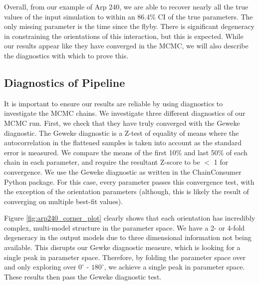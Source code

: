 Overall, from our example of Arp 240, we are able to recover nearly all the true values of the input simulation to within an 86.4\% CI of the true parameters. The only missing parameter is the time since the flyby. There is significant degeneracy in constraining the orientations of this interaction, but this is expected. While our results appear like they have converged in the MCMC, we will also describe the diagnostics with which to prove this. 

\subsection{Diagnostics of Pipeline}
\noindent It is important to ensure our results are reliable by using diagnostics to investigate the MCMC chains. We investigate three different diagnostics of our MCMC run. First, we check that they have truly converged with the Geweke diagnostic. The Geweke diagnostic is a Z-test of equality of means where the autocorrelation in the flattened samples is taken into account as the standard error is measured. We compare the means of the first 10\% and last 50\% of each chain in each parameter, and require the resultant Z-score to be $<$ 1 for convergence. We use the Geweke diagnostic as written in the ChainConsumer \citep{2016JOSS....1...45H} Python package. For this case, every parameter passes this convergence test, with the exception of the orientation parameters (although, this is likely the result of converging on multiple best-fit values).

Figure \ref{fig:arp240_corner_plot} clearly shows that each orientation has incredibly complex, multi-model structure in the parameter space. We have a 2- or 4-fold degeneracy in the output models due to three dimensional information not being available. This disrupts our Gewke diagnostic measure, which is looking for a single peak in parameter space. Therefore, by folding the parameter space over and only exploring over $0^{\circ}$ - $180^{\circ}$, we achieve a single peak in parameter space. These results then pass the Geweke diagnostic test.

